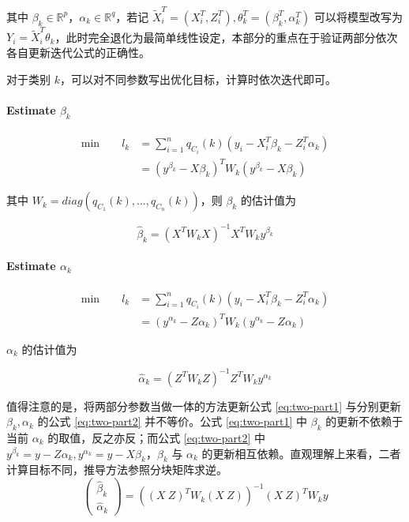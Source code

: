 \documentclass[12pt, a4paper, oneside]{article}
\numberwithin{equation}{section}
\begin{document}
其中 $\beta_k \in \mathbb{R}^p$，$\alpha_k \in \mathbb{R}^q$，若记 $\tilde X_i^T = (X_i^T, Z_i^T), \theta_k^T = (\beta_k^T, \alpha_k^T)$ 可以将模型改写为 $Y_i = \tilde X_i^T\theta_k$，此时完全退化为最简单线性设定，本部分的重点在于验证两部分依次各自更新迭代公式的正确性。

对于类别 $k$，可以对不同参数写出优化目标，计算时依次迭代即可。

\paragraph{Estimate $\beta_k$}

\begin{equation}
	\begin{aligned}
		\text{min}\qquad l_k &=  \displaystyle\sum_{i=1}^{n}q_{C_i}(k)\left(y_i - X_i^T \beta_k - Z_i^T \alpha_k\right) \\
		&= (y^{\beta_k} - X\beta_k)^T W_k (y^{\beta_k} - X\beta_k)
	\end{aligned}
\end{equation}

其中 $W_k = diag(q_{C_1}(k),...,q_{C_n}(k))$，则 $\beta_k$ 的估计值为

\begin{equation}
	\hat \beta_k = (X^{T} W_k X)^{-1} X^{T} W_k y^{\beta_k}
\end{equation}


\paragraph{Estimate $\alpha_k$}

\begin{equation}
	\begin{aligned}
		\text{min}\qquad l_k &=  \displaystyle\sum_{i=1}^{n}q_{C_i}(k)\left(y_i - X_i^T \beta_k - Z_i^T \alpha_k\right) \\
		&= (y^{\alpha_k} - Z\alpha_k)^T W_k (y^{\alpha_k} - Z\alpha_k)
	\end{aligned}
\end{equation}

$\alpha_k$ 的估计值为

\begin{equation}
	\hat \alpha_k = (Z^T W_k Z)^{-1}Z^T W_k y^{\alpha_k}
\end{equation}

值得注意的是，将两部分参数当做一体的方法更新公式 \ref{eq:two-part1} 与分别更新 $\beta_k,\alpha_k$ 的公式 \ref{eq:two-part2} 并不等价。公式 \ref{eq:two-part1} 中 $\beta_k$ 的更新不依赖于当前 $\alpha_k$ 的取值，反之亦反；而公式 \ref{eq:two-part2} 中 $y^{\beta_k} = y - Z\alpha_k,y^{\alpha_k} = y - X\beta_k$，$\beta_k$ 与 $\alpha_k$ 的更新相互依赖。直观理解上来看，二者计算目标不同，推导方法参照分块矩阵求逆。
\begin{equation}
	\left(\begin{array}{c}
		\hat{\beta}_{k} \\
		\hat{\alpha}_k
	\end{array}\right) = \left((X\ Z)^TW_k (X\ Z)\right)^{-1}(X\ Z)^T W_k y
\label{eq:two-part1}
\end{equation}
\end{document}
